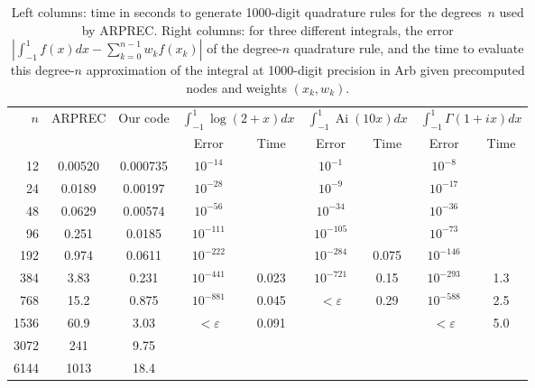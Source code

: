 \documentclass{siamart0216}
\begin{document}
\begin{table}[h!]
\caption{Left columns: time in seconds to generate 1000-digit
quadrature rules for the degrees~$n$ used by ARPREC.
Right columns: for three different integrals, the
error $|\int_{-1}^1 f(x) dx - \sum_{k=0}^{n-1} w_k f(x_k)|$ of the degree-$n$
quadrature rule, and the time to evaluate this degree-$n$ approximation
of the integral at 1000-digit precision in Arb given precomputed nodes and weights $(x_k, w_k)$.}
\begin{center}
\begin{tabular}{ r | c c | c c| c c | c c }
$n$ & ARPREC & Our code &
    \multicolumn{2}{|c|}{$\int_{-1}^{1}\!\log(2\!+\!x) dx$} &
    \multicolumn{2}{|c|}{$\int_{-1}^{1}\!\operatorname{Ai}(10 x) dx$} &
    \multicolumn{2}{|c}{$\int_{-1}^{1}\!\Gamma(1\!+\!ix) dx$} \\
   &         &          & Error   & Time      &  Error & Time  &  Error & Time \\ \hline
\rule{0pt}{3ex}12 & 0.00520 & 0.000735 & $10^{-14}$ &       &   $10^{-1}$ &  &  $10^{-8}$ & \\
24 & 0.0189 & 0.00197 & $10^{-28}$  &       &  $10^{-9}$  & &  $10^{-17}$ & \\
48 & 0.0629 & 0.00574 & $10^{-56}$ &        &  $10^{-34}$  &    &  $10^{-36}$ & \\
96 & 0.251 & 0.0185 & $10^{-111}$  &         &  $10^{-105}$ &          &  $10^{-73}$ & \\
192 & 0.974 & 0.0611 & $10^{-222}$ &         &  $10^{-284}$ &    0.075      &   $10^{-146}$ & \\
384 & 3.83 & 0.231 & $10^{-441}$  &  0.023        & $10^{-721}$ & 0.15           &   $10^{-293}$ & 1.3 \\
768 & 15.2 & 0.875 & $10^{-881}$ & 0.045      & $<\varepsilon$ & 0.29           &   $10^{-588}$ & 2.5 \\
1536 & 60.9 & 3.03 & $<\varepsilon$ &  0.091     &                &    &            $<\varepsilon$ & 5.0 \\
3072 & 241 & 9.75 &  &  &  &  &  &  \\
6144 & 1013 & 18.4 &  &  &  &  &  &  \\
\end{tabular}
\label{tab:arprectimings}
\end{center}
\end{table}
\end{document}
